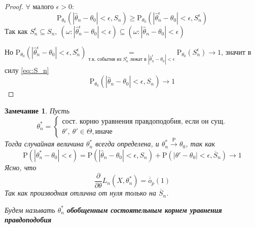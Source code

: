 \documentclass[12pt]{article}
\theoremstyle{basic_theorem}
\theoremstyle{name_theorem}
\newtheorem*{remark}{Замечание}
\newcommand\defin[1]{\textbf{#1}}
\def\P{
    \mathrm{P}
}
\def\littleO{
    \overline{\overline{o}}
}
\begin{document}
\begin{proof}
        $\forall \text{ малого } \epsilon > 0$:
        \begin{equation}
            \label{eq::S_n}
            \P_{\theta_0}(|\hat{\theta}_n - \theta_0| < \epsilon, S_n) \geq
            \P_{\theta_0}(|\hat{\theta}^\epsilon_n - \theta_0| < \epsilon, S_n^\epsilon)
        \end{equation}
        Так как $S^\epsilon_n \subseteq S_n,\
        (\omega: |\hat{\theta}^\epsilon_n - \theta_0| < \epsilon) \subseteq
        (\omega: |\hat{\theta}_n - \theta_0| < \epsilon)$
        
        Но $\P_{\theta_0}(|\hat{\theta}^\epsilon_n - \theta_0| < \epsilon, S^\epsilon_n) 
        \underset{\text{т.к. события из } S_n^\epsilon \text{ лежат в } |\hat{\theta}^\epsilon_n - \theta_0| < \epsilon}{=}
        \P_{\theta_0}(S_n^\epsilon) \rightarrow 1$, значит в силу \ref{eq::S_n}
        $$\P_{\theta_0} (|\hat{\theta}_n - \theta_0| < \epsilon, S_n) \rightarrow 1$$
    \end{proof}

    \begin{remark}
        Пусть 
        $$\theta^*_n = \begin{cases}
            \text{сост. корню уравнения правдоподобия, если он сущ.} \\
            \theta',\ \theta'\in\Theta, \text{иначе}
        \end{cases}$$
        Тогда случайная величина $\theta^*_n$ всегда определена, и
        $\theta^*_n \xrightarrow{\P} \theta_0$, так как
        $$\P(|\theta^*_n - \theta_0| < \epsilon) =
        \P(|\hat{\theta}_n - \theta_0| < \epsilon, S_n) +
        \P(|\theta' - \theta_0| < \epsilon, \overline{S}_n) \rightarrow 1$$
        Ясно, что 
        \begin{equation}
            \frac{\partial}{\partial\theta} L_n(X, \theta^*_n) = \littleO_p(1)
        \end{equation}
        Так как производная отлична от нуля только на $\overline{S}_n$.

        Будем называть $\theta_n^*$ \defin{обобщенным состоятельным корнем уравнения
        правдоподобия}
    \end{remark}
\end{document}
